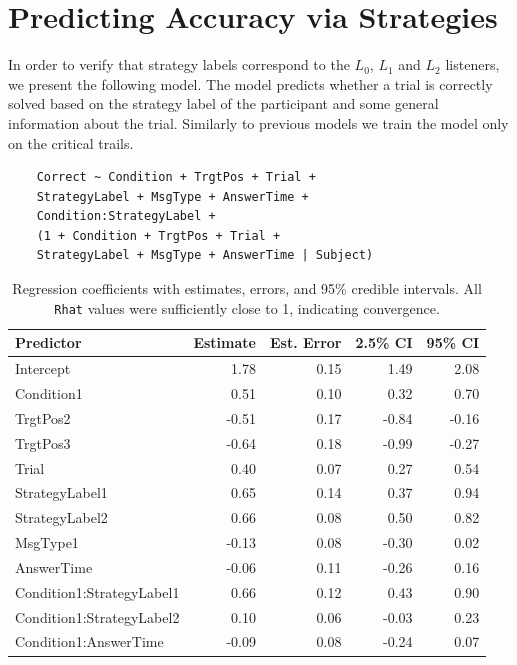 \section{Predicting Accuracy via Strategies}
\label{sec:predicting_accuracy_strategies}

In order to verify that strategy labels correspond to the $L_0$, $L_1$ and $L_2$ listeners, we present the following model. The model predicts whether a trial is correctly solved based on the strategy label of the participant and some general information about the trial. Similarly to previous models we train the model only on the critical trails. 

\begin{verbatim}
    Correct ~ Condition + TrgtPos + Trial +
    StrategyLabel + MsgType + AnswerTime +
    Condition:StrategyLabel +
    (1 + Condition + TrgtPos + Trial +
    StrategyLabel + MsgType + AnswerTime | Subject)
\end{verbatim}




\begin{table}[ht]
\centering
\begin{tabular}{lrrrr}
\hline
\textbf{Predictor} & \textbf{Estimate} & \textbf{Est. Error} & \textbf{2.5\% CI} & \textbf{95\% CI} \\
\hline
Intercept                  &  1.78 & 0.15 &  1.49 &  2.08 \\
Condition1                 &  0.51 & 0.10 &  0.32 &  0.70 \\
TrgtPos2                   & -0.51 & 0.17 & -0.84 & -0.16 \\
TrgtPos3                   & -0.64 & 0.18 & -0.99 & -0.27 \\
Trial                      &  0.40 & 0.07 &  0.27 &  0.54 \\
StrategyLabel1             &  0.65 & 0.14 &  0.37 &  0.94 \\
StrategyLabel2             &  0.66 & 0.08 &  0.50 &  0.82 \\
MsgType1                   & -0.13 & 0.08 & -0.30 &  0.02 \\
AnswerTime                 & -0.06 & 0.11 & -0.26 &  0.16 \\
Condition1:StrategyLabel1  &  0.66 & 0.12 &  0.43 &  0.90 \\
Condition1:StrategyLabel2  &  0.10 & 0.06 & -0.03 &  0.23 \\
Condition1:AnswerTime      & -0.09 & 0.08 & -0.24 &  0.07 \\
\hline
\end{tabular}
\caption{Regression coefficients with estimates, errors, and 95\% credible intervals. All \texttt{Rhat} values were sufficiently close to 1, indicating convergence.}
\label{tab:cor_strtgy}
\end{table}


